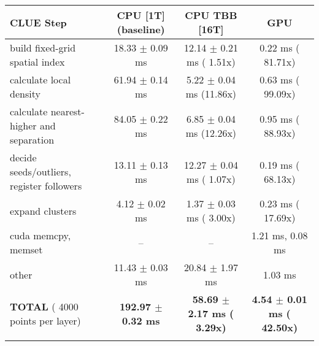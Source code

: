     \begin{tabular}{l|c|c|c}
    \hline
    CLUE Step                                 & CPU [1T] (baseline)         & CPU TBB [16T]                         & GPU                       \\ \hline
    build fixed-grid spatial index            &  18.33 $\pm$  0.09 ms       &  12.14 $\pm$  0.21 ms ( 1.51x)        &   0.22 ms ( 81.71x)       \\
    calculate local density                   &  61.94 $\pm$  0.14 ms       &   5.22 $\pm$  0.04 ms (11.86x)        &   0.63 ms ( 99.09x)       \\
    calculate nearest-higher and separation   &  84.05 $\pm$  0.22 ms       &   6.85 $\pm$  0.04 ms (12.26x)        &   0.95 ms ( 88.93x)       \\
    decide seeds/outliers, register followers &  13.11 $\pm$  0.13 ms       &  12.27 $\pm$  0.04 ms ( 1.07x)        &   0.19 ms ( 68.13x)       \\
    expand clusters                           &   4.12 $\pm$  0.02 ms       &   1.37 $\pm$  0.03 ms ( 3.00x)        &   0.23 ms ( 17.69x)       \\ \hline
    cuda memcpy, memset                       & --                          & --                                    &   1.21 ms,   0.08 ms      \\ 
    other                                     &  11.43 $\pm$  0.03 ms       &  20.84 $\pm$  1.97 ms                 &   1.03 ms                 \\ \hline
    \textbf{TOTAL} ( 4000 points per layer)   & \textbf{192.97 $\pm$  0.32 ms} & \textbf{ 58.69 $\pm$  2.17 ms ( 3.29x)} & \textbf{  4.54 $\pm$  0.01 ms ( 42.50x)}  \\
    \hline
    \multicolumn{4}{c}{} 
    \end{tabular}
    \linebreak


